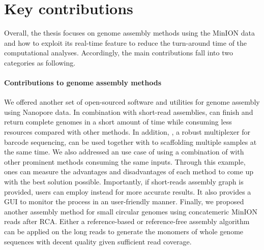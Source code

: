 \section{Key contributions}
Overall, the thesis focuses on genome assembly methods using the MinION data and how to exploit its real-time feature to reduce the turn-around time of the computational analyses.
Accordingly, the main contributions fall into two categories as following.
\paragraph{Contributions to genome assembly methods}
We offered another set of open-sourced software and utilities for genome assembly using Nanopore data.
In combination with short-read assemblies, \npscarf{} can finish and return complete genomes in a short amount of time while consuming less resources compared with other methods.
In addition, \npbarcode{}, a robust multiplexer for barcode sequencing, can be used together with \npscarf{} to scaffolding multiple samples at the same time.
We also addressed an use case of using a combination of \npscarf{} with other prominent methods consuming the same inputs. Through this example, ones can measure the advantages and disadvantages of each method to come up with the best solution possible.
Importantly, if short-reads assembly graph is provided, users can employ \npgraph{} instead for more accurate results. It also provides a GUI to monitor the process in an user-friendly manner.
Finally, we proposed another assembly method for small circular genomes using concatemeric MinION reads after RCA. Either a reference-based or reference-free assembly algorithm can be applied on the long reads to generate the monomers of whole genome sequences with decent quality given sufficient read coverage.
